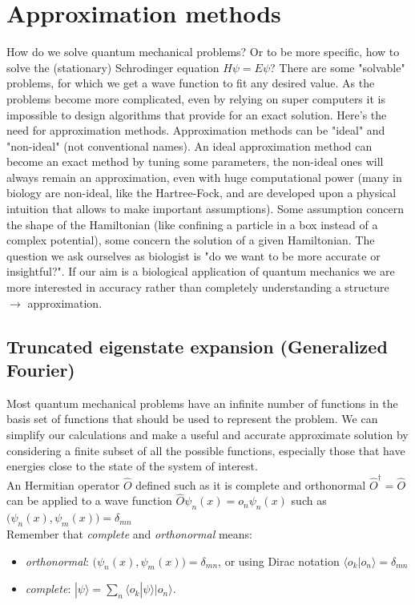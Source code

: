 \graphicspath{{chapters/05/}}
\chapter{Approximation methods}
How do we solve quantum mechanical problems? Or to be more specific, how to solve the (stationary) Schrodinger equation $ H \psi = E \psi$? There are some "solvable" problems, for which we get a wave function to fit any desired value.
As the problems become more complicated, even by relying on super computers it is impossible to design algorithms that provide for an exact solution.
Here's the need for approximation methods.
Approximation methods can be "ideal" and "non-ideal" (not conventional names).
An ideal approximation method can become an exact method by tuning some parameters, the non-ideal ones will always remain an approximation, even with huge computational power (many in biology are non-ideal, like the Hartree-Fock, and are developed upon a physical intuition that allows to make important assumptions).
Some assumption concern the shape of the Hamiltonian (like confining a particle in a box instead of a complex potential), some concern the solution of a given Hamiltonian.
The question we ask ourselves as biologist is "do we want to be more accurate or insightful?".
If our aim is a biological application of quantum mechanics we are more interested in accuracy rather than completely understanding a structure $\rightarrow$ approximation.
\section{Truncated eigenstate expansion (Generalized Fourier)}
Most quantum mechanical problems have an infinite number of functions in the basis set of functions that should be used to represent the problem. We can simplify our calculations and make a useful and accurate approximate solution by considering a finite subset of all the possible functions, especially those that have energies close to the state of the system of interest.\\
An Hermitian operator $\hat{O}$ defined such as it is complete and orthonormal $\hat{O}^\dagger=\hat{O}$ can be applied to a wave function $\hat{O}\psi_n(x)=o_n\psi_n(x)$ such as $\bigl(\psi_n(x),\psi_m(x)\bigr)=\delta_{mn}$\\
Remember that \textit{complete} and \textit{orthonormal} means:
\begin{itemize}
\item \textit{orthonormal}: $\bigl(\psi_n(x),\psi_m(x)\bigr)=\delta_{mn}$, or using Dirac notation $\langle o_k|o_n \rangle = \delta_{mn}$
\item \textit{complete}: $ | \psi \rangle = \sum_n \langle o_k | \psi \rangle |o_n \rangle$.
\end{itemize}

